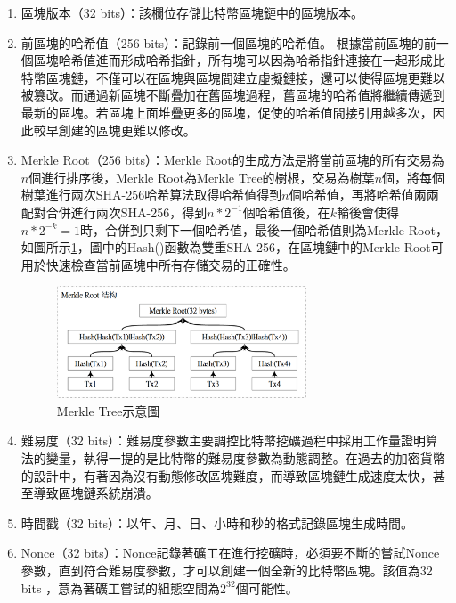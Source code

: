 				\begin{enumerate}
				\item 區塊版本（32 bits）：該欄位存儲比特幣區塊鏈中的區塊版本。
				\item 前區塊的哈希值（256 bits）：記錄前一個區塊的哈希值。 根據當前區塊的前一個區塊哈希值進而形成哈希指針，所有塊可以因為哈希指針連接在一起形成比特幣區塊鏈，不僅可以在區塊與區塊間建立虛擬鏈接，還可以使得區塊更難以被篡改。而通過新區塊不斷疊加在舊區塊過程，舊區塊的哈希值將繼續傳遞到最新的區塊。若區塊上面堆疊更多的區塊，促使的哈希值間接引用越多次，因此較早創建的區塊更難以修改。
				\item Merkle Root（256 bits）：Merkle Root的生成方法是將當前區塊的所有交易為$n$個進行排序後，Merkle Root為Merkle Tree的樹根，交易為樹葉$n$個，將每個樹葉進行兩次SHA-256哈希算法取得哈希值得到$n$個哈希值，再將哈希值兩兩配對合併進行兩次SHA-256，得到$n*2^{-1}$個哈希值後，在$k$輪後會使得$n*2^{-k}=1$時，合併到只剩下一個哈希值，最後一個哈希值則為Merkle Root，如圖所示\ref{MerkleRoot}，圖中的Hash()函數為雙重SHA-256，在區塊鏈中的Merkle Root可用於快速檢查當前區塊中所有存儲交易的正確性。

				\begin{figure}[htbp]
					\centering
					\includegraphics[width = 0.7\textwidth]{MerkleRoot.png}
					\caption{Merkle Tree示意圖}\label{MerkleRoot}
				\end{figure}

				\item 難易度（32 bits）：難易度參數主要調控比特幣挖礦過程中採用工作量證明算法的變量，執得一提的是比特幣的難易度參數為動態調整。在過去的加密貨幣的設計中，有著因為沒有動態修改區塊難度，而導致區塊鏈生成速度太快，甚至導致區塊鏈系統崩潰。
				\item 時間戳（32 bits）：以年、月、日、小時和秒的格式記錄區塊生成時間。
				\item Nonce（32 bits）：Nonce記錄著礦工在進行挖礦時，必須要不斷的嘗試Nonce參數，直到符合難易度參數，才可以創建一個全新的比特幣區塊。該值為32 bits ，意為著礦工嘗試的組態空間為$2^{32}$個可能性。
				\end{enumerate}
				
